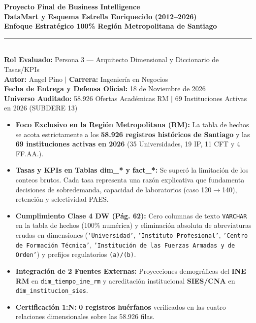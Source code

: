 \documentclass[11pt,a4paper]{article}
\begin{document}
\begin{center}
    {\Huge\bfseries\color{primaryblue} Proyecto Final de Business Intelligence}\\[0.25cm]
    {\LARGE\bfseries\color{secondaryblue} DataMart y Esquema Estrella Enriquecido (2012--2026)}\\[0.2cm]
    {\large\bfseries\color{accentteal} Enfoque Estratégico 100\% Región Metropolitana de Santiago}\\[0.4cm]
    \rule{\linewidth}{1.2pt}\\[0.3cm]
    \textbf{Rol Evaluado:} Persona 3 --- Arquitecto Dimensional y Diccionario de Tasas/KPIs\\
    \textbf{Autor:} Angel Pino \quad $|$ \quad \textbf{Carrera:} Ingeniería en Negocios\\
    \textbf{Fecha de Entrega y Defensa Oficial:} 18 de Noviembre de 2026\\
    \textbf{Universo Auditado:} 58.926 Ofertas Académicas RM $|$ 69 Instituciones Activas en 2026 (SUBDERE 13)
\end{center}

\vspace{0.4cm}

\begin{tcolorbox}[colback=primaryblue!5!white,colframe=primaryblue,title=\textbf{Síntesis de Cumplimiento Técnico y Feedback Docente Aplicado}]
\begin{itemize}[leftmargin=*]
    \item \textbf{Foco Exclusivo en la Región Metropolitana (RM):} La tabla de hechos se acota estrictamente a los \textbf{58.926 registros históricos de Santiago} y las \textbf{69 instituciones activas en 2026} (35 Universidades, 19 IP, 11 CFT y 4 FF.AA.).
    \item \textbf{Tasas y KPIs en Tablas dim\_* y fact\_*:} Se superó la limitación de los conteos brutos. Cada tasa representa una razón explicativa que fundamenta decisiones de sobredemanda, capacidad de laboratorios (caso 120$\rightarrow$140), retención y selectividad PAES.
    \item \textbf{Cumplimiento Clase 4 DW (Pág. 62):} Cero columnas de texto \texttt{VARCHAR} en la tabla de hechos (100\% numérica) y eliminación absoluta de abreviaturas crudas en dimensiones (\texttt{'Universidad'}, \texttt{'Instituto Profesional'}, \texttt{'Centro de Formación Técnica'}, \texttt{'Institución de las Fuerzas Armadas y de Orden'}) y prefijos regulatorios \texttt{(a)/(b)}.
    \item \textbf{Integración de 2 Fuentes Externas:} Proyecciones demográficas del \textbf{INE RM} en \texttt{dim\_tiempo\_ine\_rm} y acreditación institucional \textbf{SIES/CNA} en \texttt{dim\_institucion\_sies}.
    \item \textbf{Certificación 1:N:} \textbf{0 registros huérfanos} verificados en las cuatro relaciones dimensionales sobre las 58.926 filas.
\end{itemize}
\end{tcolorbox}
\end{document}

